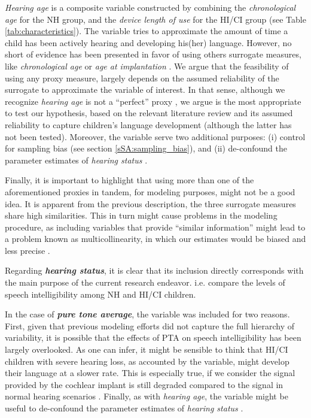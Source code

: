 \textit{Hearing age} is a composite variable constructed by combining the \textit{chronological age} for the NH group, and the \textit{device length of use} for the HI/CI group \citep{Faes_et_al_2021} (see Table \ref{tab:characteristics}). The variable tries to approximate the amount of time a child has been actively hearing and developing his(her) language. However, no short of evidence has been presented in favor of using others surrogate measures, like \textit{chronological age} \cite{Flipsen_et_al_2006, Habib_et_al_2010, Grandon_et_al_2020} or \textit{age at implantation} \cite{Niparko_et_al_2010, Boons_et_al_2012, Bruijnzeel_et_al_2016, Dettman_et_al_2016}. We argue that the feasibility of using any proxy measure, largely depends on the assumed reliability of the surrogate to approximate the variable of interest. In that sense, although we recognize \textit{hearing age} is not a ``perfect'' proxy \cite{Faes_et_al_2021}, we argue is the most appropriate to test our hypothesis, based on the relevant literature review and its assumed reliability to capture children's language development (although the latter has not been tested). Moreover, the variable serve two additional purposes: (i) control for sampling bias (see section \ref{sSA:sampling_bias}), and (ii) de-confound the parameter estimates of \textit{hearing status} \cite{Cinelli_et_al_2021}.

Finally, it is important to highlight that using more than one of the aforementioned proxies in tandem, for modeling purposes, might not be a good idea. It is apparent from the previous description, the three surrogate measures share high similarities. This in turn might cause problems in the modeling procedure, as including variables that provide ``similar information'' might lead to a problem known as multicollinearity, in which our estimates would be biased and less precise \cite{Farrar_et_al_1967}.

Regarding \textbf{\textit{hearing status}}, it is clear that its inclusion directly corresponds with the main purpose of the current research endeavor. i.e. compare the levels of speech intelligibility among NH and HI/CI children.

In the case of \textbf{\textit{pure tone average}}, the variable was included for two reasons. First, given that previous modeling efforts did not capture the full hierarchy of variability, it is possible that the effects of PTA on speech intelligibility has been largely overlooked. As one can infer, it might be sensible to think that HI/CI children with severe hearing loss, as accounted by the variable, might develop their language at a slower rate. This is especially true, if we consider the signal provided by the cochlear implant is still degraded compared to the signal in normal hearing scenarios \cite{Drennan_et_al_2008}. Finally, as with \textit{hearing age}, the variable might be useful to de-confound the parameter estimates of \textit{hearing status} \cite{Cinelli_et_al_2021}.

